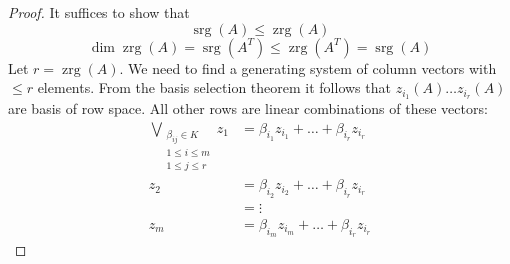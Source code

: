 \documentclass[a4paper,landscape,twocolumn]{article}
\begin{document}
\begin{proof}
  It suffices to show that
  \[ \operatorname{srg}(A) \leq \operatorname{zrg}(A) \]
  \[ \dim{\operatorname{zrg}(A)} = \operatorname{srg}(A^T) \leq \operatorname{zrg}(A^T) = \operatorname{srg}(A) \]
  Let $r = \operatorname{zrg}(A)$.
  We need to find a generating system of column vectors with $\leq r$ elements.
  From the basis selection theorem it follows that
  $z_{i_1}(A) \ldots z_{i_r}(A)$ are basis of row space.
  All other rows are linear combinations of these vectors:
  \begin{align*}
    \bigvee_{\substack{\beta_{ij} \in K \\ 1 \leq i \leq m \\ 1 \leq j \leq r}}
      z_1 &= \beta_{i_1} z_{i_1} + \ldots + \beta_{i_r} z_{i_r} \\
      z_2 &= \beta_{i_2} z_{i_2} + \ldots + \beta_{i_r} z_{i_r} \\
          &= \vdots \\
      z_m &= \beta_{i_m} z_{i_m} + \ldots + \beta_{i_r} z_{i_r}
  \end{align*}


\end{proof}
\end{document}
